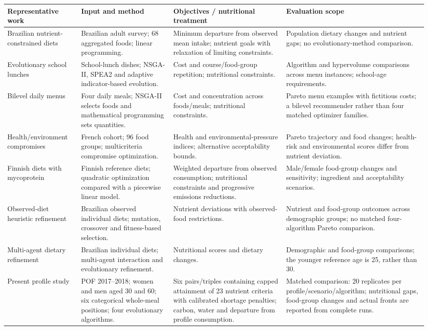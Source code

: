 \begin{tabularx}{\textwidth}{*{4}{>{\raggedright\arraybackslash}X}}
\toprule
Representative work & Input and method & Objectives / nutritional treatment & Evaluation scope \\
\midrule
Brazilian nutrient-constrained diets \cite{dossantos2018food} & Brazilian adult survey; 68 aggregated foods; linear programming. & Minimum departure from observed mean intake; nutrient goals with relaxation of limiting constraints. & Population dietary changes and nutrient gaps; no evolutionary-method comparison. \\
\midrule
Evolutionary school lunches \cite{ramos2021lunches} & School-lunch dishes; NSGA-II, SPEA2 and adaptive indicator-based evolution. & Cost and course/food-group repetition; nutritional constraints. & Algorithm and hypervolume comparisons across menu instances; school-age requirements. \\
\midrule
Bilevel daily menus \cite{pochmann2022multi} & Four daily meals; NSGA-II selects foods and mathematical programming sets quantities. & Cost and concentration across foods/meals; nutritional constraints. & Pareto menu examples with fictitious costs; a bilevel recommender rather than four matched optimizer families. \\
\midrule
Health/environment compromises \cite{kesse2026balancing} & French cohort; 96 food groups; multicriteria compromise optimization. & Health and environmental-pressure indices; alternative acceptability bounds. & Pareto trajectory and food changes; health-risk and environmental scores differ from nutrient deviation. \\
\midrule
Finnish diets with mycoprotein \cite{fu2025finnish} & Finnish reference diets; quadratic optimization compared with a piecewise linear model. & Weighted departure from observed consumption; nutritional constraints and progressive emissions reductions. & Male/female food-group changes and sensitivity; ingredient and acceptability scenarios. \\
\midrule
Observed-diet heuristic refinement \cite{da2025bio} & Brazilian observed individual diets; mutation, crossover and fitness-based selection. & Nutrient deviations with observed-food restrictions. & Nutrient and food-group outcomes across demographic groups; no matched four-algorithm Pareto comparison. \\
\midrule
Multi-agent dietary refinement \cite{da2025intelligent} & Brazilian individual diets; multi-agent interaction and evolutionary refinement. & Nutritional scores and dietary changes. & Demographic and food-group comparisons; the younger reference age is 25, rather than 30. \\
\midrule
Present profile study & POF 2017--2018; women and men aged 30 and 60; six categorical whole-meal positions; four evolutionary algorithms. & Six pairs/triples containing capped attainment of 23 nutrient criteria with calibrated shortage penalties; carbon, water and departure from profile consumption. & Matched comparison: 20 replicates per profile/scenario/algorithm; nutritional gaps, food-group changes and actual fronts are reported from complete runs. \\
\bottomrule
\end{tabularx}
